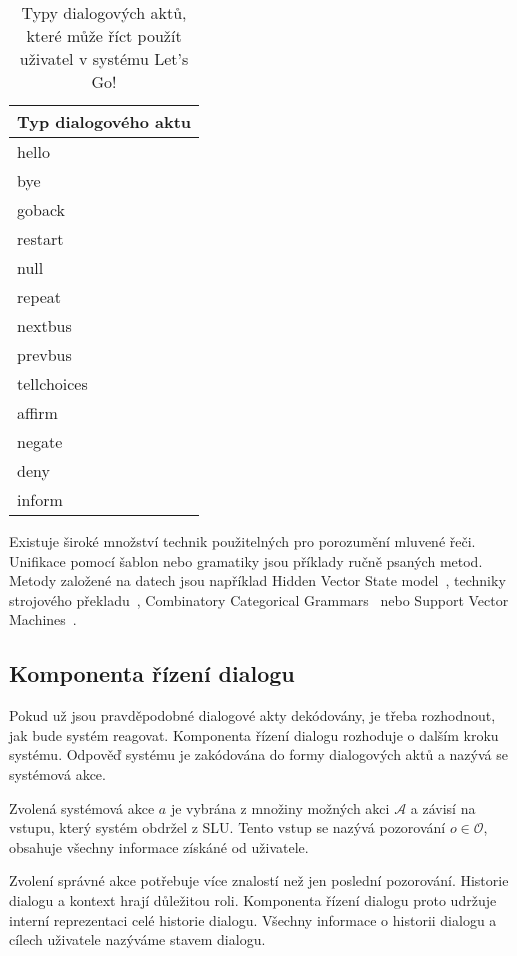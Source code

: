 \begin{table}[b!]
\begin{center}
\begin{tabular}{|l|}
\hline
Typ dialogového aktu \\
\hline
\hline
hello \\
\hline
bye \\
\hline
goback \\
\hline
restart \\
\hline
null \\
\hline
repeat \\
\hline
nextbus \\
\hline
prevbus \\
\hline
tellchoices \\
\hline
affirm \\
\hline
negate \\
\hline
deny \\
\hline
inform \\
\hline
\end{tabular}
\caption{Typy dialogových aktů, které může říct použít uživatel v systému Let's Go!}
\label{tab:dstcdat}
\end{center}
\end{table}

Existuje široké množství technik použitelných pro porozumění mluvené řeči.
Unifikace pomocí šablon nebo gramatiky jsou příklady ručně psaných metod.
Metody založené na datech jsou například Hidden Vector State model~\cite{he2005semantic}, techniky strojového překladu~\cite{wong2007learning}, Combinatory Categorical Grammars~\cite{zettlemoyer2007online} nebo Support Vector Machines~\cite{mairesse2009spoken}.

\subsection{Komponenta řízení dialogu}

Pokud už jsou pravděpodobné dialogové akty dekódovány, je třeba rozhodnout, jak bude systém reagovat.
Komponenta řízení dialogu rozhoduje o dalším kroku systému.
Odpověď systému je zakódována do formy dialogových aktů a nazývá se systémová akce.

Zvolená systémová akce $a$ je vybrána z množiny možných akci $\mathcal{A}$ a závisí na vstupu, který systém obdržel z SLU.
Tento vstup se nazývá pozorování $o \in \mathcal{O}$, obsahuje všechny informace získáné od uživatele.

Zvolení správné akce potřebuje více znalostí než jen poslední pozorování.
Historie dialogu a kontext hrají důležitou roli.
Komponenta řízení dialogu proto udržuje interní reprezentaci celé historie dialogu.
Všechny informace o historii dialogu a cílech uživatele nazýváme stavem dialogu.


